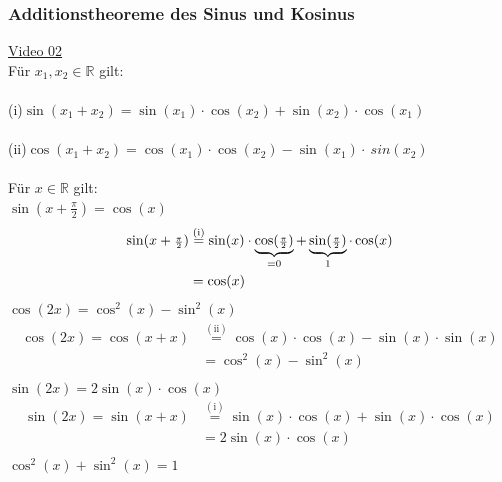 \subsubsection{Additionstheoreme des Sinus und Kosinus}\label{sec:Bezeichnung}
\href{https://youtu.be/Q-yJWE6P4uU}{Video 02}\\
Für $ x_1, x_2 \in\mathbb{R} $ gilt:\\ \\
(i)\;\;$ \sin(x_1+x_2)=\sin(x_1)\cdot \cos (x_2)+\sin(x_2)\cdot \cos(x_1)$\\ \\
(ii)\;$ \cos(x_1+x_2)=\cos(x_1)\cdot \cos(x_2) - \sin(x_1)\cdot \
sin(x_2)$\\ \\
Für $ x\in\mathbb{R} $ gilt:\\
\textbullet \;\;$\sin(x+\frac{\pi}{2})=\cos(x)$\\
\begin{align*}
\sin(x+\genfrac{}{}{}{2}{\pi }{2 })&\overset{(\mathrm{i})}{=}\sin(x)\cdot \underbrace {\cos(\genfrac{}{}{}{2}{\pi }{2 })}_{=0}+\underbrace {\sin(\genfrac{}{}{}{2}{\pi}{2 })}_{1}\cdot \cos(x)\\
&=\cos(x)
\end{align*}
\textbullet\;\;$\cos(2x)=\cos^2(x)-\sin^2(x)$\\
\begin{align*}
\cos(2x)=\cos(x+x)&\overset {(\mathrm{ii})}{=}\cos(x)\cdot\cos(x)-\sin(x)\cdot\sin(x)\\
&=\cos^2(x)-\sin^2(x)\\
\end{align*}
\textbullet \;\;$ \sin(2x)=2\sin(x)\cdot\cos(x) $\\
\begin{align*}
\sin(2x)=\sin(x+x)&\overset{(\mathrm{i})}{=}\sin(x)\cdot \cos(x)+\sin(x)\cdot \cos(x)\\
&=2\sin(x)\cdot\cos(x) \\
\end{align*}
\textbullet\;\;$\cos^2(x)+\sin^2(x)=1$\\
\newpage
\noindent
